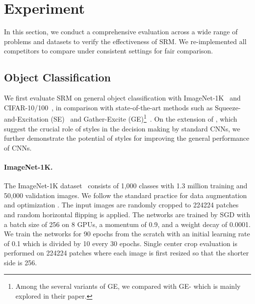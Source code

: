 \section{Experiment} \label{experiment}

In this section, we conduct a comprehensive evaluation across a wide range of problems and datasets to verify the effectiveness of SRM.
We re-implemented all competitors to compare under consistent settings for fair comparison. 

\subsection{Object Classification} \label{image_classification}

We first evaluate SRM on general object classification with ImageNet-1K~\cite{russakovsky2015imagenet} and CIFAR-10/100~\cite{krizhevsky2009learning}, in comparison with state-of-the-art methods such as Squeeze-and-Excitation (SE)~\cite{hu2018squeeze} and Gather-Excite (GE)\footnote{Among the several variants of GE, we compared with GE- which is mainly explored in their paper.}~\cite{hu2018gather}.
On the extension of \cite{brendel2019approximating,geirhos2019imagenet}, which suggest the crucial role of styles in the decision making by standard CNNs, we further demonstrate the potential of styles for improving the general performance of CNNs.

\paragraph{ImageNet-1K.}
The ImageNet-1K dataset~\cite{russakovsky2015imagenet} consists of 1,000 classes with 1.3 million training and 50,000 validation images.
We follow the standard practice for data augmentation and optimization \cite{he2016deep}.
The input images are randomly cropped to  224224 patches and random horizontal flipping is applied.
The networks are trained by SGD with a batch size of 256 on 8 GPUs, a momentum of 0.9, and a weight decay of 0.0001.
We train the networks for 90 epochs from the scratch with an initial learning rate of 0.1 which is divided by 10 every 30 epochs.
Single center crop evaluation is performed on 224224 patches where each image is first resized so that the shorter side is 256. 

